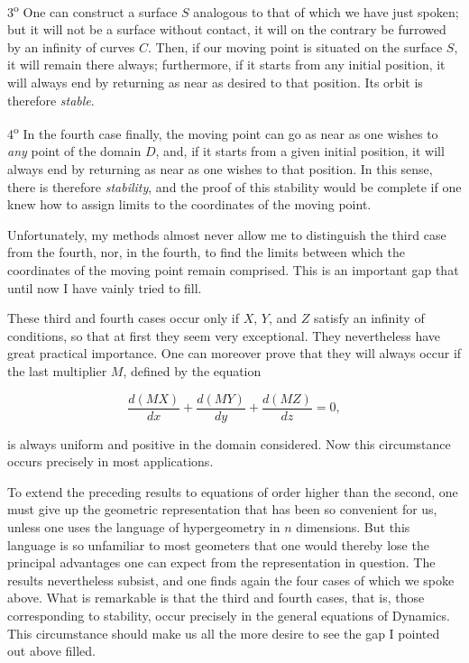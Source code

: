 \documentclass[11pt]{article}
\begin{document}
3\textsuperscript{o} One can construct a surface $S$ analogous to that of which we have just spoken; but it will not be a surface without contact, it will on the contrary be furrowed by an infinity of curves $C$. Then, if our moving point is situated on the surface $S$, it will remain there always; furthermore, if it starts from any initial position, it will always end by returning as near as desired to that position. Its orbit is therefore \emph{stable}.

4\textsuperscript{o} In the fourth case finally, the moving point can go as near as one wishes to \emph{any} point of the domain $D$, and, if it starts from a given initial position, it will always end by returning as near as one wishes to that position. In this sense, there is therefore \emph{stability}, and the proof of this stability would be complete if one knew how to assign limits to the coordinates of the moving point.

Unfortunately, my methods almost never allow me to distinguish the third case from the fourth, nor, in the fourth, to find the limits between which the coordinates of the moving point remain comprised. This is an important gap that until now I have vainly tried to fill.

These third and fourth cases occur only if $X$, $Y$, and $Z$ satisfy an infinity of conditions, so that at first they seem very exceptional. They nevertheless have great practical importance. One can moreover prove that they will always occur if the last multiplier $M$, defined by the equation

\[
\frac{d(MX)}{dx}+\frac{d(MY)}{dy}+\frac{d(MZ)}{dz}=0,
\]

is always uniform and positive in the domain considered. Now this circumstance occurs precisely in most applications.

To extend the preceding results to equations of order higher than the second, one must give up the geometric representation that has been so convenient for us, unless one uses the language of hypergeometry in $n$ dimensions. But this language is so unfamiliar to most geometers that one would thereby lose the principal advantages one can expect from the representation in question. The results nevertheless subsist, and one finds again the four cases of which we spoke above. What is remarkable is that the third and fourth cases, that is, those corresponding to stability, occur precisely in the general equations of Dynamics. This circumstance should make us all the more desire to see the gap I pointed out above filled.
\end{document}
